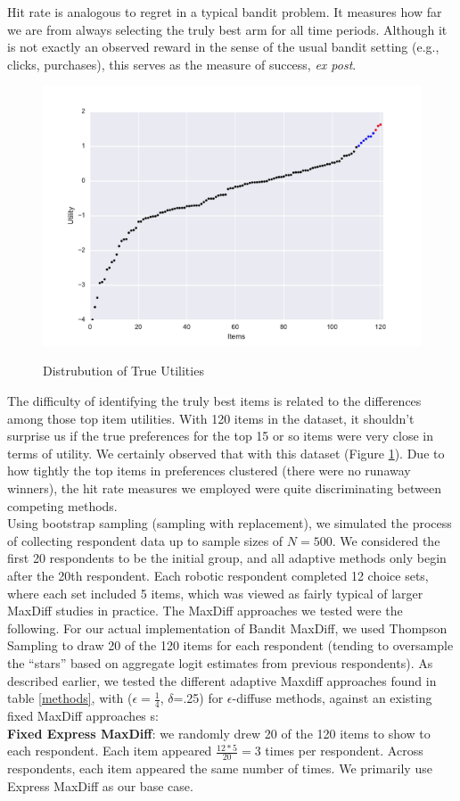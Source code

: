 \documentclass[nonblindrev]{informs3}
\begin{document}
Hit rate is analogous to regret in a typical bandit problem. It measures how far we are from always selecting the truly best arm for all time periods. Although it is not exactly an observed reward in the sense of the usual bandit setting (e.g., clicks, purchases), this serves as the measure of success, \textit{ex post}.\\
\begin{figure}[!ht]
\caption{Distrubution of True Utilities}
\includegraphics[width=1\textwidth]{plots/utilscore.pdf}
\label{fig:util}
\end{figure}
The difficulty of identifying the truly best items is related to the differences among those top item utilities. With 120 items in the dataset, it shouldn't surprise us if the true preferences for the top 15 or so items were very close in terms of utility.  We certainly observed that with this dataset (Figure \ref{fig:util}).  Due to how tightly the top items in preferences clustered (there were no runaway winners), the hit rate measures we employed were quite discriminating between competing methods.\\
Using bootstrap sampling (sampling with replacement), we simulated the process of collecting respondent data up to sample sizes of $N=500$.  We considered the first 20 respondents to be the initial group, and all adaptive methods only begin after the 20th respondent. Each robotic respondent completed 12 choice sets, where each set included 5 items, which was viewed as fairly typical of larger MaxDiff studies in practice.
The MaxDiff approaches we tested were the following. For our actual implementation of Bandit MaxDiff, we used Thompson Sampling to draw 20 of the 120 items for each respondent (tending to oversample the ``stars'' based on aggregate logit estimates from previous respondents).  As described earlier, we tested the different adaptive Maxdiff approaches found in table \ref{methods}, with ($\epsilon=\frac{1}{4}$, $\delta$=.25) for $\epsilon$-diffuse methods, against an existing fixed MaxDiff approaches s:\\
\textbf{Fixed Express MaxDiff}: we randomly drew 20 of the 120 items to show to each respondent.  Each item appeared $\frac{12*5}{20} = 3$ times per respondent.  Across respondents, each item appeared the same number of times. We primarily use Express MaxDiff as our base case.\\
\end{document}
